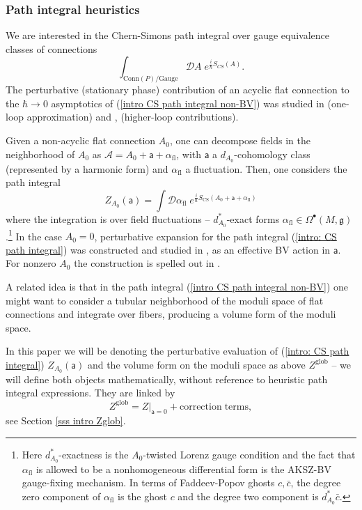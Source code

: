 \documentclass[11pt,a4paper]{amsart}
\theoremstyle{plain} %
\theoremstyle{definition}
\theoremstyle{remark}
\newcommand{\g}{\mathfrak{g}}
\newcommand{\mr}{\mathrm}
\newcommand{\sfa}{\mathsf{a}}
\newcommand{\bt}{\bullet}
\newcommand{\ra}{\rightarrow}
\newcommand{\mc}{\mathcal}
\begin{document}
\subsubsection{Path integral heuristics}
We are interested in the Chern-Simons path integral over gauge equivalence classes of connections
\begin{equation}\label{intro CS path integral non-BV}
    \int_{\mr{Conn}(P)/\mr{Gauge}} \mc{D}A\; e^{\frac{i}{\hbar}S_{CS}(A)}.
\end{equation}
The perturbative (stationary phase) contribution of an acyclic flat connection to the $\hbar\ra 0$ asymptotics of  (\ref{intro CS path integral non-BV}) was studied in \cite{Witten1989} (one-loop approximation) and \cite{Axelrod1991}, \cite{Axelrod1994} (higher-loop contributions).

Given a non-acyclic flat connection $A_0$, one can decompose fields in the neighborhood of $A_0$ as $\mc{A}=A_0+\sfa+\alpha_\mr{fl}$, with $\sfa$ a $d_{A_0}$-cohomology class (represented by a harmonic form) and $\alpha_\mr{fl}$ a fluctuation. Then, one considers the path integral 
\begin{equation}\label{intro: CS path integral}
    Z_{A_0}(\sfa)= \int \mc{D}\alpha_\mr{fl}\; e^{\frac{i}{\hbar}S_\mr{CS}(A_0+\sfa+\alpha_\mr{fl})}
\end{equation}
where the integration is over field fluctuations -- $d^*_{A_0}$-exact forms $\alpha_\mr{fl}\in \Omega^\bt(M,\g)$.\footnote{Here $d^*_{A_0}$-exactness is the $A_0$-twisted Lorenz gauge condition and the fact that $\alpha_\mr{fl}$ is allowed to be a nonhomogeneous differential form is the AKSZ-BV gauge-fixing mechanism. In terms of Faddeev-Popov ghosts $c,\bar{c}$, the degree zero component of $\alpha_\mr{fl}$ is the ghost $c$ and the degree two component is $d^*_{A_0}\bar{c}$.}
In the case $A_0=0$, perturbative expansion for the path integral (\ref{intro: CS path integral}) was constructed and studied in \cite{Cattaneo2008}, as an effective BV action in $\sfa$.  For nonzero $A_0$ the construction is spelled out in \cite{Wernli2022}.

A related idea is that in the path integral (\ref{intro CS path integral non-BV}) one might want to consider a tubular neighborhood of the moduli space of flat connections and integrate over fibers, producing a volume form of the moduli space.

In this paper we will be denoting the perturbative evaluation of (\ref{intro: CS path integral}) $Z_{A_0}(\sfa)$ and the volume form on the moduli space as above $Z^\mr{glob}$ -- we will define both objects mathematically, without reference to heuristic path integral expressions. They are linked by $$Z^\mr{glob}=Z|_{\sfa=0}+\mr{correction\; terms},$$ 
see Section \ref{sss intro Zglob}.
\end{document}
